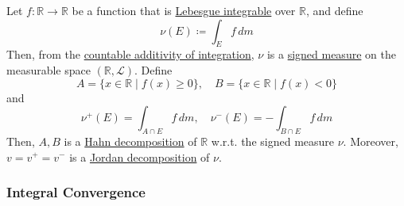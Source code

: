   \begin{example}
    \label{ex:signed-measure-from-function}
    Let $f: \mathbb{R} \to \mathbb{R}$ be a function that is \hyperref[def:leb-int-signed]{Lebesgue integrable} over $\mathbb{R}$, and define 
    \begin{equation}
      \nu(E) \coloneqq \int_E f \,dm
    \end{equation}
    Then, from the \hyperref[thm:countable-additivity-of-integration]{countable additivity of integration}, $\nu$ is a \hyperref[def:signed-measure]{signed measure} on the measurable space $(\mathbb{R}, \mathcal{L})$. Define 
    \begin{equation}
      A = \{x \in \mathbb{R} \mid f(x) \geq 0 \}, \quad B = \{x \in \mathbb{R} \mid f(x) < 0 \}
    \end{equation}
    and 
    \begin{equation}
      \nu^+ (E) = \int_{A \cap E} f \,dm, \quad \nu^- (E) = - \int_{B \cap E} f \,dm
    \end{equation}
    Then, $A, B$ is a \hyperref[thm:hahn-decomposition-theorem]{Hahn decomposition} of $\mathbb{R}$ w.r.t. the signed measure $\nu$. Moreover, $v = v^+ = v^-$ is a \hyperref[thm:jordan-decomposition-theorem]{Jordan decomposition} of $\nu$. 
  \end{example}

\subsubsection{Integral Convergence}

